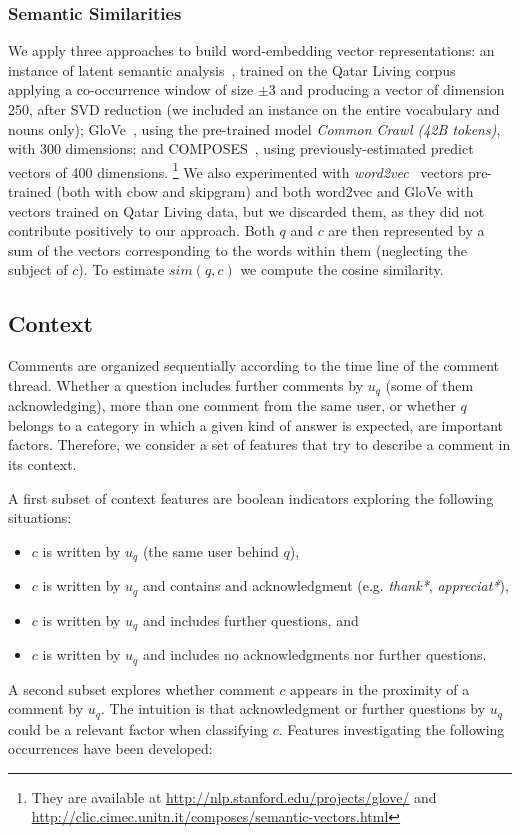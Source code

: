 \subsubsection{Semantic Similarities}
\label{sub:semantic}

We apply three approaches to build  word-embedding vector representations:
\Ni an instance of latent semantic analysis~\cite{croce-previtali:2010:GEMS}, 
trained on the Qatar Living corpus applying a co-occurrence window of size 
$\pm3$ and producing a vector of dimension 250, after SVD reduction (we included 
an instance on the entire vocabulary and nouns only);
\Nii GloVe~\cite{Pennington:2014}, using the pre-trained model \textit{Common 
Crawl (42B tokens)}, with 300 dimensions; and 
\Niii COMPOSES~\cite{Baroni:2014}, using previously-estimated predict vectors of 
400 dimensions.%
\footnote{They are available at \url{http://nlp.stanford.edu/projects/glove/} 
and \url{http://clic.cimec.unitn.it/composes/semantic-vectors.html}}
We also experimented with \textit{word2vec}~\cite{Mikolov:2013} vectors 
pre-trained (both with cbow and skipgram) and both word2vec and GloVe with 
vectors trained on Qatar Living data, but we discarded them, as they did not 
contribute positively to our approach. Both $q$ and $c$ are then represented by 
a sum of the vectors corresponding to the words within them (neglecting the 
subject of $c$). To estimate $sim(q,c)$ we compute the cosine similarity. 

\subsection{Context}
\label{ssub:context}

Comments are organized sequentially according to the time line of the comment 
thread. Whether a question includes further comments by $u_q$ (some of them 
acknowledging), more than one comment from the same user, or whether $q$ belongs 
to a category in which a given kind of answer is expected, are important 
factors. Therefore, we consider a set of features that try to describe a 
comment in its context.   

A first subset of context features are boolean indicators exploring the 
following situations:

\begin{itemize}\setlength\itemsep{0em}
\item $c$ is written by $u_q$ (\ie the same user behind $q$),
\item \label{enu:context_ack} 
  $c$ is written by $u_q$ and contains and acknowledgment (e.g.   
  \textit{thank*}, \textit{appreciat*}),
\item \label{enu:context_quest}
  $c$ is written by $u_q$ and includes further questions, and 
\item $c$ is written by $u_q$ and includes no acknowledgments nor further 
questions.
\end{itemize}
% 
A second subset explores whether comment $c$ appears in the proximity of a 
comment by $u_q$. The intuition is that acknowledgment or further questions by 
$u_q$ could be a relevant factor when classifying $c$. Features investigating 
the following occurrences have been developed:

